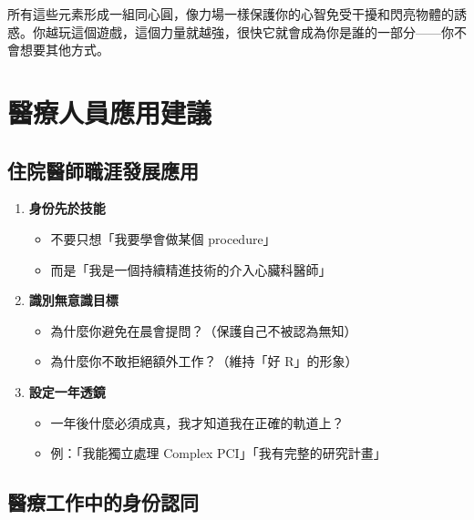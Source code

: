 \documentclass[12pt,a4paper]{article}
\begin{document}
\begin{tcolorbox}[colback=emergency_blue!5!white, colframe=emergency_blue, title=\textbf{專注力護盾}]
所有這些元素形成一組同心圓，像力場一樣保護你的心智免受干擾和閃亮物體的誘惑。你越玩這個遊戲，這個力量就越強，很快它就會成為你是誰的一部分——你不會想要其他方式。
\end{tcolorbox}

\section{醫療人員應用建議}

\subsection{住院醫師職涯發展應用}

\begin{enumerate}
    \item \textbf{身份先於技能}
    \begin{itemize}
        \item 不要只想「我要學會做某個 procedure」
        \item 而是「我是一個持續精進技術的介入心臟科醫師」
    \end{itemize}

    \item \textbf{識別無意識目標}
    \begin{itemize}
        \item 為什麼你避免在晨會提問？（保護自己不被認為無知）
        \item 為什麼你不敢拒絕額外工作？（維持「好 R」的形象）
    \end{itemize}

    \item \textbf{設定一年透鏡}
    \begin{itemize}
        \item 一年後什麼必須成真，我才知道我在正確的軌道上？
        \item 例：「我能獨立處理 Complex PCI」「我有完整的研究計畫」
    \end{itemize}
\end{enumerate}

\subsection{醫療工作中的身份認同}
\end{document}
